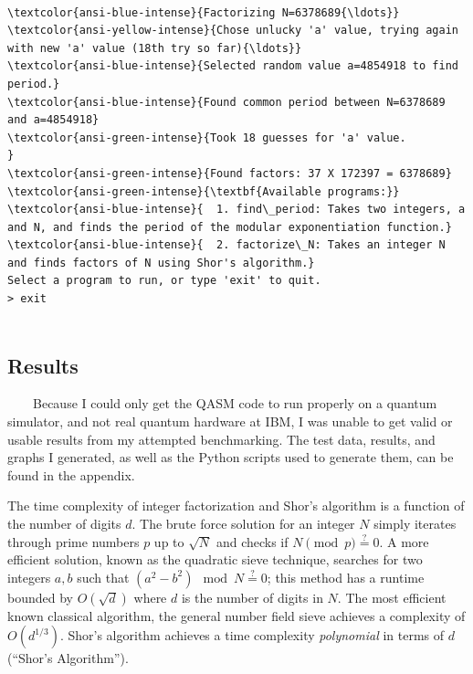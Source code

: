 \documentclass[11pt]{article}
\begin{document}
    \begin{Verbatim}[commandchars=\\\{\}]






\textcolor{ansi-blue-intense}{Factorizing N=6378689{\ldots}}
\textcolor{ansi-yellow-intense}{Chose unlucky 'a' value, trying again with new 'a' value (18th try so far){\ldots}}
\textcolor{ansi-blue-intense}{Selected random value a=4854918 to find period.}
\textcolor{ansi-blue-intense}{Found common period between N=6378689 and a=4854918}
\textcolor{ansi-green-intense}{Took 18 guesses for 'a' value.             }
\textcolor{ansi-green-intense}{Found factors: 37 X 172397 = 6378689}
\textcolor{ansi-green-intense}{\textbf{Available programs:}}
\textcolor{ansi-blue-intense}{  1. find\_period: Takes two integers, a and N, and finds the period of the modular exponentiation function.}
\textcolor{ansi-blue-intense}{  2. factorize\_N: Takes an integer N and finds factors of N using Shor's algorithm.}
Select a program to run, or type 'exit' to quit.
> exit


    \end{Verbatim}

    \hypertarget{results}{%
\subsection{Results}\label{results}}

~~~~Because I could only get the QASM code to run properly on a quantum
simulator, and not real quantum hardware at IBM, I was unable to get
valid or usable results from my attempted benchmarking. The test data,
results, and graphs I generated, as well as the Python scripts used to
generate them, can be found in the appendix.

The time complexity of integer factorization and Shor's algorithm is a
function of the number of digits \(d\). The brute force solution for an
integer \(N\) simply iterates through prime numbers \(p\) up to
\(\sqrt N\) and checks if \(N\pmod p\stackrel{?}{=} 0\). A more
efficient solution, known as the quadratic sieve technique, searches for
two integers \(a, b\) such that \((a^2-b^2) \mod N\stackrel{?}{=} 0\);
this method has a runtime bounded by \(O(\sqrt d)\) where \(d\) is the
number of digits in \(N\). The most efficient known classical algorithm,
the general number field sieve achieves a complexity of \(O(d^{1/3})\).
Shor's algorithm achieves a time complexity \emph{polynomial} in terms
of \(d\) (``Shor's Algorithm'').
\end{document}
